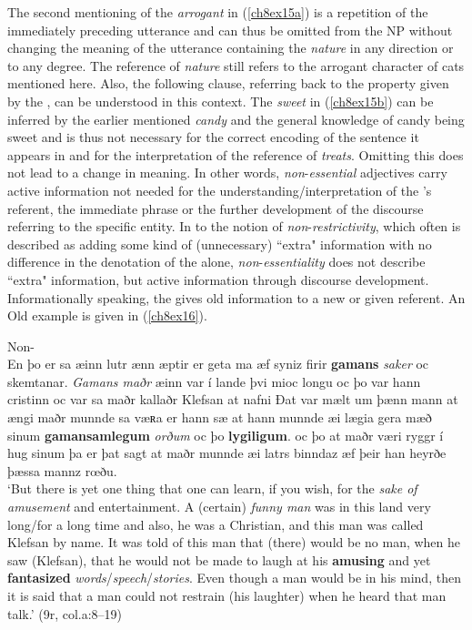 \documentclass[output=paper,colorlinks,citecolor=brown]{langscibook}
\begin{document}
The second mentioning of the  \emph{arrogant} in (\ref{ch8ex15a}) is a
repetition of the immediately preceding utterance and can thus be
omitted from the NP without changing the meaning of the utterance
containing the  \emph{nature} in any direction or to any degree. The
reference of \emph{nature} still refers to the arrogant character of
cats mentioned here. Also, the following clause, referring back to the
property given by the , can be understood in this context. The
 \emph{sweet} in (\ref{ch8ex15b}) can be inferred by the earlier mentioned
\emph{candy} and the general knowledge of candy being sweet and is thus
not necessary for the correct encoding of the sentence it appears in and
for the interpretation of the reference of \emph{treats}. Omitting this
 does not lead to a change in meaning. In other words,
\emph{non}-\emph{essential} adjectives carry {active} information not
needed for the understanding/interpretation of the 's referent, the
immediate phrase or the further development of the discourse referring
to the specific entity. In  to the notion of
\emph{non}-\emph{restrictivity}, which often is described as adding
some kind of (unnecessary) ``extra" information with no difference in the
denotation of the  alone, \emph{non}-\emph{essentiality} does not
describe ``extra" information, but active information through discourse
development. Informationally speaking, the  gives old
information to a new or given referent. An Old  example is
given in (\ref{ch8ex16}).

\begin{exe}
\ex\label{ch8ex16}Non-\\
En þo er sa æinn lutr ænn æptir er geta ma æf syniz firir \textbf{gamans} \textit{saker}
oc skemtanar. \textit{Gamans maðr} æinn var í lande þvi mioc longu oc þo var
hann cristinn oc var sa maðr kallaðr Klefsan at nafni Ðat var mælt um
þænn mann at ængi maðr munnde sa væʀa er hann sæ at hann munnde æi lægia
gera mæð sinum \textbf{gamansamlegum} \textit{orðum} oc þo \textbf{lygiligum}. oc þo at
maðr væri ryggr í hug sinum þa er þat sagt at maðr munnde æi latrs
binndaz æf þeir han heyrðe þæssa mannz rœðu.\\

\noindent `But there is yet one thing that one can learn, if you wish, for the
\textit{sake of amusement} and entertainment. A (certain) \textit{funny man} was in
this land very long/for a long time and also, he was a Christian, and
this man was called Klefsan by name. It was told of this man that
(there) would be no man, when he saw (Klefsan), that he would not be made to laugh at
his \textbf{amusing }and yet \textbf{fantasized} \textit{words}/\textit{speech}/\textit{stories}.
Even though a man would be  in his mind, then it is said that a man
could not restrain (his laughter) when he heard that man talk.' (9r, col.a:8--19)
\end{exe}
\end{document}
